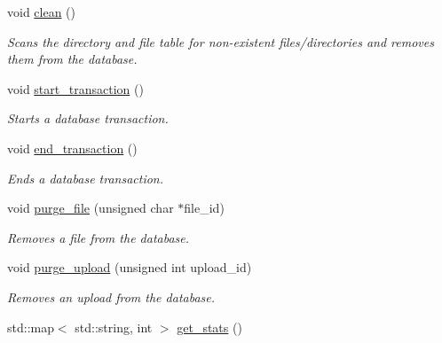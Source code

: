 \begin{DoxyCompactItemize}
void \hyperlink{class_vessel_1_1_database_1_1_local_database_a4863f63ed1a6ad1dbbcce0208759a5d7}{clean} ()
\begin{DoxyCompactList}\small\item\em Scans the directory and file table for non-\/existent files/directories and removes them from the database. \end{DoxyCompactList}\item 
\mbox{\label{class_vessel_1_1_database_1_1_local_database_a1a5348e3de490bb8b1fb7c923dc5d9de}} 
void \hyperlink{class_vessel_1_1_database_1_1_local_database_a1a5348e3de490bb8b1fb7c923dc5d9de}{start\+\_\+transaction} ()
\begin{DoxyCompactList}\small\item\em Starts a database transaction. \end{DoxyCompactList}\item 
\mbox{\label{class_vessel_1_1_database_1_1_local_database_aae0ba68d8107d44d7fdc1137675ff0c6}} 
void \hyperlink{class_vessel_1_1_database_1_1_local_database_aae0ba68d8107d44d7fdc1137675ff0c6}{end\+\_\+transaction} ()
\begin{DoxyCompactList}\small\item\em Ends a database transaction. \end{DoxyCompactList}\item 
void \hyperlink{class_vessel_1_1_database_1_1_local_database_ab6315c29e00efda7ac808f68a054f0ea}{purge\+\_\+file} (unsigned char $\ast$file\+\_\+id)
\begin{DoxyCompactList}\small\item\em Removes a file from the database. \end{DoxyCompactList}\item 
void \hyperlink{class_vessel_1_1_database_1_1_local_database_a328b2ea5ed242bacc70ea6bf248bf44d}{purge\+\_\+upload} (unsigned int upload\+\_\+id)
\begin{DoxyCompactList}\small\item\em Removes an upload from the database. \end{DoxyCompactList}\item 
std\+::map$<$ std\+::string, int $>$ \hyperlink{class_vessel_1_1_database_1_1_local_database_ab55e12266822635ba8d4e74b9ca17a7d}{get\+\_\+stats} ()
\end{DoxyCompactItemize}
